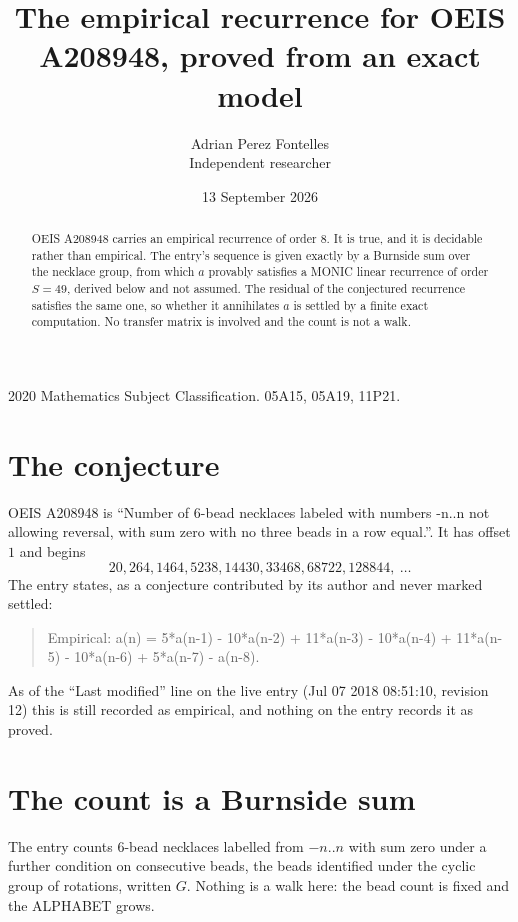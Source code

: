 \documentclass[11pt,a4paper]{article}
\title{The empirical recurrence for OEIS A208948, proved from an exact model}
\author{Adrian Perez Fontelles\\ \small Independent researcher}
\date{13 September 2026}
\theoremstyle{plain}
\theoremstyle{definition}
\begin{document}
\maketitle

\begin{abstract}
OEIS A208948 carries an empirical recurrence of order $8$. It is true, and it is
decidable rather than empirical. The entry's sequence is given exactly by a Burnside sum over the necklace group, from
which $a$ provably satisfies a MONIC linear recurrence of order $S=49$, derived below and not
assumed. The residual of the conjectured recurrence satisfies the same one, so whether it
annihilates $a$ is settled by a finite exact computation. No transfer matrix is involved and
the count is not a walk.
\end{abstract}

\noindent\small 2020 Mathematics Subject Classification. 05A15, 05A19, 11P21.\normalsize

\section{The conjecture}

OEIS A208948 is ``Number of 6-bead necklaces labeled with numbers -n..n not allowing reversal, with sum zero with no three beads in a row equal.''. It has offset $1$ and begins
\[
20, 264, 1464, 5238, 14430, 33468, 68722, 128844,\ \dots
\]
The entry states, as a conjecture contributed by its author and never marked settled:
\begin{quote}
Empirical: a(n) = 5*a(n-1) - 10*a(n-2) + 11*a(n-3) - 10*a(n-4) + 11*a(n-5) - 10*a(n-6) + 5*a(n-7) - a(n-8).
\end{quote}
As of the ``Last modified'' line on the live entry (Jul 07 2018 08:51:10, revision 12)
this is still recorded as empirical, and nothing on the entry records it as proved.

\section{The count is a Burnside sum}

The entry counts $6$-bead necklaces labelled from $-n..n$ with sum zero under a further
condition on consecutive beads, the beads identified under the cyclic group of rotations, written $G$. Nothing is a
walk here: the bead count is fixed and the ALPHABET grows.
\end{document}
